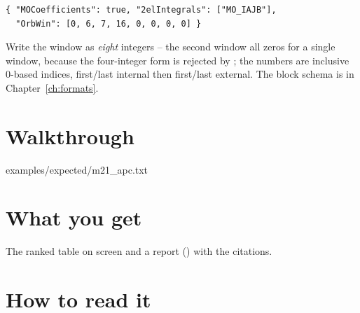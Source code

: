 \begin{lstlisting}[style=fbkcode]
{ "MOCoefficients": true, "2elIntegrals": ["MO_IAJB"],
  "OrbWin": [0, 6, 7, 16, 0, 0, 0, 0] }
\end{lstlisting}

Write the window as \emph{eight} integers -- the second window all zeros for a
single window, because the four-integer form is rejected by
; the numbers are inclusive 0-based indices, first/last
internal then first/last external.  The block schema is in
Chapter~\ref{ch:formats}.

\section{Walkthrough}


  {examples/expected/m21_apc.txt}

\section{What you get}

The ranked table on screen and a report () with the
citations.

\section{How to read it}

